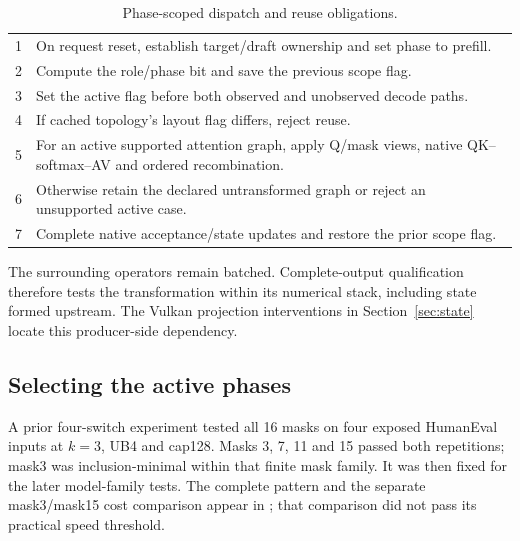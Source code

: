\begin{table}[t]
\caption{Phase-scoped dispatch and reuse obligations.}
\label{alg:scope}
\begin{tabularx}{\columnwidth}{@{}rX@{}}\toprule
1 & On request reset, establish target/draft ownership and set phase to prefill.\\
2 & Compute the role/phase bit and save the previous scope flag.\\
3 & Set the active flag before both observed and unobserved decode paths.\\
4 & If cached topology's layout flag differs, reject reuse.\\
5 & For an active supported attention graph, apply Q/mask views, native QK--softmax--AV and ordered recombination.\\
6 & Otherwise retain the declared untransformed graph or reject an unsupported active case.\\
7 & Complete native acceptance/state updates and restore the prior scope flag.\\\bottomrule
\end{tabularx}
\end{table}

The surrounding operators remain batched. Complete-output qualification therefore tests the transformation within its numerical stack, including state formed upstream. The Vulkan projection interventions in Section~\ref{sec:state} locate this producer-side dependency.

\subsection{Selecting the active phases}
A prior four-switch experiment tested all 16 masks on four exposed HumanEval inputs at $k=3$, UB4 and cap128. Masks 3, 7, 11 and 15 passed both repetitions; mask3 was inclusion-minimal within that finite mask family. It was then fixed for the later model-family tests. The complete pattern and the separate mask3/mask15 cost comparison appear in ; that comparison did not pass its practical speed threshold.
